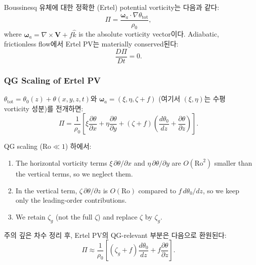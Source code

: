 Boussinesq 유체에 대한 정확한 (Ertel) potential vorticity는 다음과 같다:
\begin{equation}\label{eq:ertel}
  \Pi = \frac{\boldsymbol{\omega}_a \cdot \nabla\theta_{\mathrm{tot}}}{\rho_0},
\end{equation}
where $\boldsymbol{\omega}_a = \nabla\times\mathbf{V} + f\hat{k}$ is the
absolute vorticity vector이다.  Adiabatic, frictionless flow에서 Ertel PV는
materially conserved된다:
\begin{equation}\label{eq:ertel-conserve}
  \frac{D\Pi}{Dt} = 0.
\end{equation}

\subsubsection{QG Scaling of Ertel PV}

$\theta_{\mathrm{tot}} = \theta_0(z) + \theta(x,y,z,t)$와
$\boldsymbol{\omega}_a = (\xi, \eta, \zeta + f)$ (여기서 $(\xi,\eta)$는
수평 vorticity 성분)를 전개하면:
\begin{equation}\label{eq:ertel-expand}
  \Pi = \frac{1}{\rho_0}\left[
    \xi\frac{\partial\theta}{\partial x}
    + \eta\frac{\partial\theta}{\partial y}
    + (\zeta + f)\left(\frac{d\theta_0}{dz} + \frac{\partial\theta}{\partial z}\right)
  \right].
\end{equation}

\noindent
QG scaling ($\mathrm{Ro} \ll 1$) 하에서:
\begin{enumerate}
  \item The horizontal vorticity terms $\xi\,\partial\theta/\partial x$ and
        $\eta\,\partial\theta/\partial y$ are $O(\mathrm{Ro}^2)$ smaller than the
        vertical terms, so we neglect them.
  \item In the vertical term, $\zeta\,\partial\theta/\partial z$ is
        $O(\mathrm{Ro})$ compared to $f\,d\theta_0/dz$, so we keep only
        the leading-order contributions.
  \item We retain $\zeta_g$ (not the full $\zeta$) and replace $\zeta$ by $\zeta_g$.
\end{enumerate}

\noindent
주의 깊은 차수 정리 후, Ertel PV의 QG-relevant 부분은 다음으로 환원된다:
\begin{equation}\label{eq:ertel-qg-reduce}
  \Pi \approx \frac{1}{\rho_0}\left[
    (\zeta_g + f)\frac{d\theta_0}{dz}
    + f\frac{\partial\theta}{\partial z}
  \right].
\end{equation}

